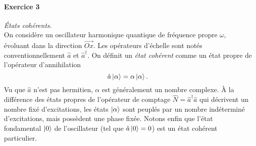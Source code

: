 \paragraph{Exercice 3} \textit{États cohérents.} \\
On considère un oscillateur harmonique quantique de fréquence propre $\omega$, évoluant dans la direction $\vec{Ox}$. Les opérateurs d'échelle sont notés conventionnellement $\hat a$ et $\hat a^\dagger$. On définit un \textit{état cohérent} comme un état propre de l'opérateur d'annihilation 
\begin{equation}
\hat a \ket{\alpha} = \alpha \ket{\alpha}.
\end{equation}
Vu que $\hat a$ n'est pas hermitien, $\alpha$ est généralement un nombre complexe. À la différence des états propres de l'opérateur de comptage $\hat N = \hat a^\dagger \hat a$ qui décrivent un nombre fixé d'excitations, les états $\ket{\alpha}$ sont peuplés par un nombre indéterminé d'excitations, mais possèdent une phase fixée. Notons enfin que l'état fondamental $\ket{0}$ de l'oscillateur (tel que $\hat a \ket{0} = 0$) est un état cohérent particulier. 


